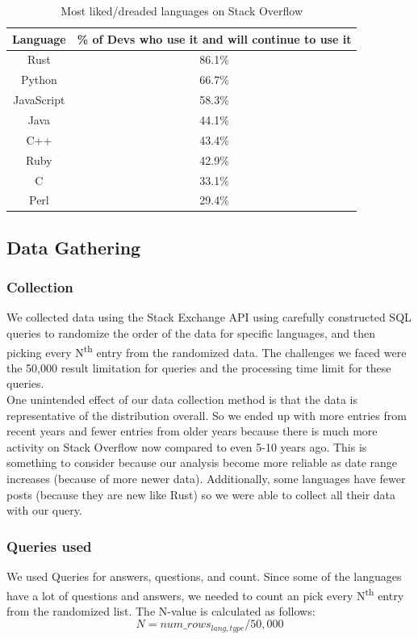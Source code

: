 \documentclass[conference]{IEEEtran}
\begin{document}
\begin{table}[htbp]
\caption{Most liked/dreaded languages on Stack Overflow}
\begin{center}
\begin{tabular}{|c|c|}
\hline
\textbf{Language}&\textbf{\% of Devs who use it and will continue to use it}\\
\hline
Rust&86.1\%\\
\hline
Python&66.7\%\\
\hline
JavaScript&58.3\%\\
\hline
Java&44.1\%\\
\hline
C++&43.4\%\\
\hline
Ruby&42.9\%\\
\hline
C&33.1\%\\
\hline
Perl&29.4\%\\
\hline
\end{tabular}
\label{tab1}
\end{center}
\end{table}

\subsection{Data Gathering}
\subsubsection{Collection}
We collected data using the Stack Exchange API \cite{b28} using carefully constructed SQL queries to randomize the order of the data for specific languages, and then picking every N\textsuperscript{th} entry from the randomized data. The challenges we faced were the 50,000 result limitation for queries and the processing time limit for these queries.\\

One unintended effect of our data collection method is that the data is representative of the distribution overall. So we ended up with more entries from recent years and fewer entries from older years because there is much more activity on Stack Overflow now compared to even 5-10 years ago. This is something to consider because our analysis become more reliable as date range increases (because of more newer data). Additionally, some languages have fewer posts (because they are new like Rust) so we were able to collect all their data with our query.\\

\subsubsection{Queries used}
We used Queries for answers, questions, and count. Since some of the languages have a lot of questions and answers, we needed to count an pick every N\textsuperscript{th} entry from the randomized list. The N-value is calculated as follows:
\begin{equation}
    N = num\_rows_{lang, type} / 50,000
\end{equation}
\end{document}
